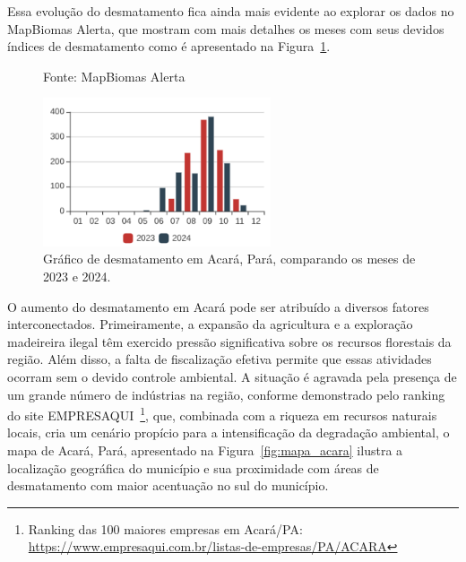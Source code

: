\documentclass[12pt, a4paper, onecolumn, notitlepage]{article}
\begin{document}
    Essa evolução do desmatamento fica ainda mais evidente ao explorar os dados no MapBiomas Alerta, que mostram com mais detalhes os meses com seus devidos índices de desmatamento como é apresentado na Figura~\ref{fig:grafico_desmatamento_meses_2023_2024}.

    \begin{figure}[htbp]
        \centering
        \caption*{Fonte: MapBiomas Alerta}
        \includegraphics[width=0.6\textwidth]{figures/grafico_desmatamento_meses_2023_2024.png}
        \caption{Gráfico de desmatamento em Acará, Pará, comparando os meses de 2023 e 2024.}
        \label{fig:grafico_desmatamento_meses_2023_2024}
    \end{figure}

    O aumento do desmatamento em Acará pode ser atribuído a diversos fatores interconectados. Primeiramente, a expansão da agricultura e a exploração madeireira ilegal têm exercido pressão significativa sobre os recursos florestais da região. Além disso, a falta de fiscalização efetiva permite que essas atividades ocorram sem o devido controle ambiental. A situação é agravada pela presença de um grande número de indústrias na região, conforme demonstrado pelo ranking do site EMPRESAQUI~\footnote{Ranking das 100 maiores empresas em Acará/PA: \url{https://www.empresaqui.com.br/listas-de-empresas/PA/ACARA}}, que, combinada com a riqueza em recursos naturais locais, cria um cenário propício para a intensificação da degradação ambiental, o mapa de Acará, Pará, apresentado na Figura~\ref{fig:mapa_acara} ilustra a localização geográfica do município e sua proximidade com áreas de desmatamento com maior acentuação no sul do município.
\end{document}
